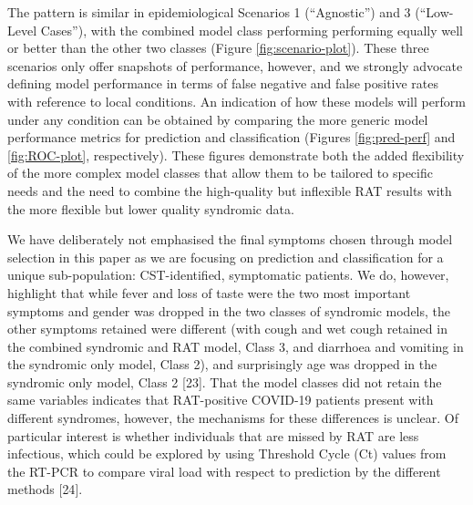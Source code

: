 \documentclass[]{elsarticle} %
\begin{document}
The pattern is similar in epidemiological Scenarios 1 (``Agnostic'') and 3 (``Low-Level Cases''), with the combined model class performing performing equally well or better than the other two classes (Figure \ref{fig:scenario-plot}).
These three scenarios only offer snapshots of performance, however, and we strongly advocate defining model performance in terms of false negative and false positive rates with reference to local conditions.
An indication of how these models will perform under any condition can be obtained by comparing the more generic model performance metrics for prediction and classification (Figures \ref{fig:pred-perf} and \ref{fig:ROC-plot}, respectively).
These figures demonstrate both the added flexibility of the more complex model classes that allow them to be tailored to specific needs and the need to combine the high-quality but inflexible RAT results with the more flexible but lower quality syndromic data.

We have deliberately not emphasised the final symptoms chosen through model selection in this paper as we are focusing on prediction and classification for a unique sub-population: CST-identified, symptomatic patients.
We do, however, highlight that while fever and loss of taste were the two most important symptoms and gender was dropped in the two classes of syndromic models, the other symptoms retained were different (with cough and wet cough retained in the combined syndromic and RAT model, Class 3, and diarrhoea and vomiting in the syndromic only model, Class 2), and surprisingly age was dropped in the syndromic only model, Class 2 {[}23{]}.
That the model classes did not retain the same variables indicates that RAT-positive COVID-19 patients present with different syndromes, however, the mechanisms for these differences is unclear.
Of particular interest is whether individuals that are missed by RAT are less infectious, which could be explored by using Threshold Cycle (Ct) values from the RT-PCR to compare viral load with respect to prediction by the different methods {[}24{]}.
\end{document}
